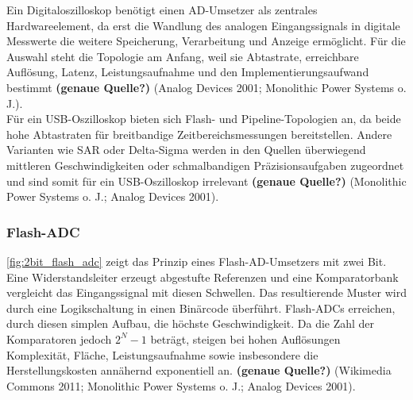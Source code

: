 \documentclass[a4paper, portrait, 12pt]{scrartcl} %
\begin{document}
Ein Digitaloszilloskop benötigt einen AD-Umsetzer als zentrales Hardwareelement, da erst die Wandlung des analogen Eingangssignals in digitale Messwerte die weitere Speicherung, Verarbeitung und Anzeige ermöglicht. Für die Auswahl steht die Topologie am Anfang, weil sie Abtastrate, erreichbare Auflösung, Latenz, Leistungsaufnahme und den Implementierungsaufwand bestimmt \textbf{(genaue Quelle?)} (Analog Devices 2001; Monolithic Power Systems o. J.).\\

Für ein USB-Oszilloskop bieten sich Flash- und Pipeline-Topologien an, da beide hohe Abtastraten für breitbandige Zeitbereichsmessungen bereitstellen. Andere Varianten wie SAR oder Delta-Sigma werden in den Quellen überwiegend mittleren Geschwindigkeiten oder schmalbandigen Präzisionsaufgaben zugeordnet und sind somit für ein USB-Oszilloskop irrelevant \textbf{(genaue Quelle?)} (Monolithic Power Systems o. J.; Analog Devices 2001).\\

\subsubsection{Flash-ADC}
\autoref{fig:2bit_flash_adc} zeigt das Prinzip eines Flash-AD-Umsetzers mit zwei Bit. Eine Widerstandsleiter erzeugt abgestufte Referenzen und eine Komparatorbank vergleicht das Eingangssignal mit diesen Schwellen. Das resultierende Muster wird durch eine Logikschaltung in einen Binärcode überführt. Flash-ADCs erreichen, durch diesen simplen Aufbau, die höchste Geschwindigkeit. Da die Zahl der Komparatoren jedoch $2^N-1$ beträgt, steigen bei hohen Auflösungen Komplexität, Fläche, Leistungsaufnahme sowie insbesondere die Herstellungskosten annähernd exponentiell an. \textbf{(genaue Quelle?)} (Wikimedia Commons 2011; Monolithic Power Systems o. J.; Analog Devices 2001).
\end{document}
